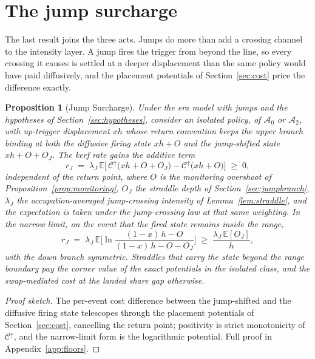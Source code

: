\documentclass[11pt,a4paper]{article}
\theoremstyle{definition}
\theoremstyle{plain}
\newtheorem{proposition}{Proposition}
\theoremstyle{remark}
\begin{document}
\section{The jump surcharge}\label{sec:surcharge}

The last result joins the three acts. Jumps do more than add a crossing channel to the intensity layer. A jump fires the trigger from beyond the line, so every crossing it causes is settled 
at a deeper displacement than the same policy would have paid diffusively, and the placement potentials of Section~\ref{sec:cost} price the difference exactly.

\begin{proposition}[Jump Surcharge]\label{prop:surcharge}
Under the era model with jumps and the hypotheses of Section~\ref{sec:hypotheses}, consider an isolated policy, of $\mathcal{A}_0$ or $\mathcal{A}_2$, with up-trigger displacement $xh$ whose 
return convention keeps the upper branch binding at both the diffusive firing state $xh + O$ and the jump-shifted state $xh + O + O_J$. The kerf rate gains the additive term
\[
r_J \;=\; \lambda_J\,
\mathbb{E}\Big[\, \mathcal{C}^{\uparrow}\big(xh
+ O + O_J\big) - \mathcal{C}^{\uparrow}\big(xh
+ O\big) \Big] \;\ge\; 0,
\]
independent of the return point, where $O$ is the monitoring overshoot of Proposition~\ref{prop:monitoring}, $O_J$ the straddle depth of Section~\ref{sec:jumpbranch}, $\lambda_J$ the 
occupation-averaged jump-crossing intensity of Lemma~\ref{lem:straddle}, and the expectation is taken under the jump-crossing law at that same weighting. In the narrow limit, on the 
event that the fired state remains inside the range,
\[
r_J \;=\; \lambda_J\, \mathbb{E}\Big[\ln
\frac{(1-x)\,h - O}
{(1-x)\,h - O - O_J}\Big]
\;\ge\; \frac{\lambda_J\, \mathbb{E}[O_J]}{h},
\]
with the down branch symmetric. Straddles that carry the state beyond the range boundary pay the corner value of the exact potentials in the isolated class, and the swap-mediated 
cost at the landed share gap otherwise.
\end{proposition}

\begin{proof}[Proof sketch]
The per-event cost difference between the jump-shifted and the diffusive firing state telescopes through the placement potentials of Section~\ref{sec:cost}, cancelling the return point; 
positivity is strict monotonicity of $\mathcal{C}^{\uparrow}$, and the narrow-limit form is the logarithmic potential. Full proof in Appendix~\ref{app:floors}.
\end{proof}
\end{document}

